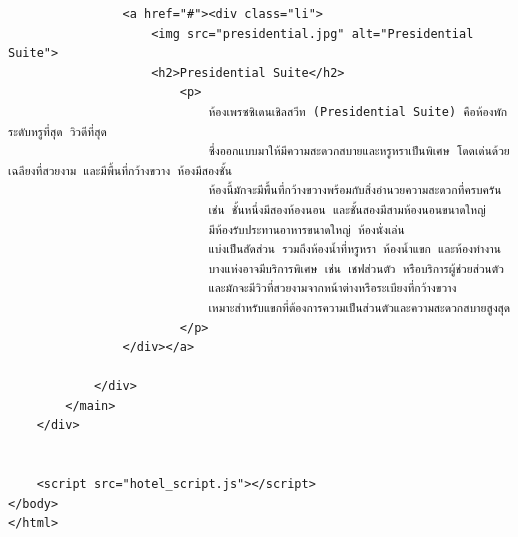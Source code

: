\documentclass{report}
\begin{document}
\begin{verbatim}
                <a href="#"><div class="li">
                    <img src="presidential.jpg" alt="Presidential Suite">
                    <h2>Presidential Suite</h2>
                        <p>
                            ห้องเพรซซิเดนเชิลสวีท (Presidential Suite) คือห้องพักระดับหรูที่สุด วิวดีที่สุด
                            ซึ่งออกแบบมาให้มีความสะดวกสบายและหรูหราเป็นพิเศษ โดดเด่นด้วยเฉลียงที่สวยงาม และมีพื้นที่กว้างขวาง ห้องมีสองชั้น
                            ห้องนี้มักจะมีพื้นที่กว้างขวางพร้อมกับสิ่งอำนวยความสะดวกที่ครบครัน 
                            เช่น ชั้นหนึ่งมีสองห้องนอน และชั้นสองมีสามห้องนอนขนาดใหญ่ 
                            มีห้องรับประทานอาหารขนาดใหญ่ ห้องนั่งเล่น 
                            แบ่งเป็นสัดส่วน รวมถึงห้องน้ำที่หรูหรา ห้องน้ำแขก และห้องทำงาน
                            บางแห่งอาจมีบริการพิเศษ เช่น เชฟส่วนตัว หรือบริการผู้ช่วยส่วนตัว   
                            และมักจะมีวิวที่สวยงามจากหน้าต่างหรือระเบียงที่กว้างขวาง 
                            เหมาะสำหรับแขกที่ต้องการความเป็นส่วนตัวและความสะดวกสบายสูงสุด
                        </p>
                </div></a>
                
            </div>
        </main>
    </div>
 

    <script src="hotel_script.js"></script>
</body>
</html>
\end{verbatim}
\end{document}
